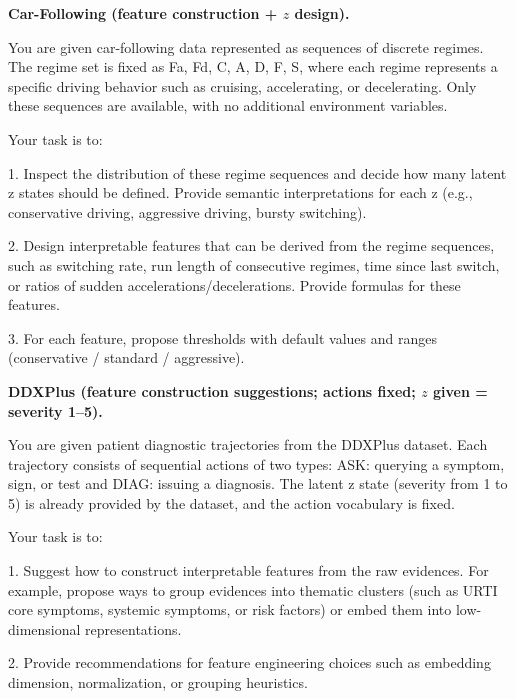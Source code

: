 \documentclass{article} %
\begin{document}
\noindent\textbf{Car-Following (feature construction + $z$ design).}\\[-0.3em]
\begin{PromptBox}
You are given car-following data represented as sequences of discrete regimes.
The regime set is fixed as {Fa, Fd, C, A, D, F, S}, where each regime represents
a specific driving behavior such as cruising, accelerating, or decelerating.
Only these sequences are available, with no additional environment variables.

Your task is to:

1. Inspect the distribution of these regime sequences and decide how many latent
   z states should be defined. Provide semantic interpretations for each z
   (e.g., conservative driving, aggressive driving, bursty switching).

2. Design interpretable features that can be derived from the regime sequences,
   such as switching rate, run length of consecutive regimes, time since last
   switch, or ratios of sudden accelerations/decelerations. Provide formulas for
   these features.

3. For each feature, propose thresholds with default values and ranges
   (conservative / standard / aggressive).
\end{PromptBox}

\noindent\textbf{DDXPlus (feature construction suggestions; actions fixed; $z$ given = severity 1--5).}\\[-0.3em]
\begin{PromptBox}
You are given patient diagnostic trajectories from the DDXPlus dataset.
Each trajectory consists of sequential actions of two types:
ASK: querying a symptom, sign, or test and DIAG: issuing a diagnosis.
The latent z state (severity from 1 to 5) is already provided by the dataset,
and the action vocabulary is fixed.

Your task is to:

1. Suggest how to construct interpretable features from the raw evidences.
   For example, propose ways to group evidences into thematic clusters
   (such as URTI core symptoms, systemic symptoms, or risk factors)
   or embed them into low-dimensional representations.

2. Provide recommendations for feature engineering choices such as
   embedding dimension, normalization, or grouping heuristics.
\end{PromptBox}
\end{document}
